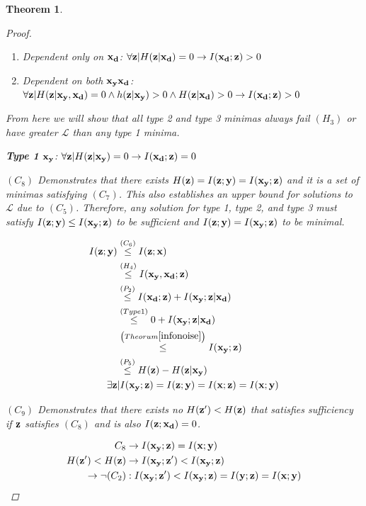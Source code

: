 \documentclass[letterpaper]{article} %
\theoremstyle{plain}
\newtheorem{theorem}{Theorem}[section]
\theoremstyle{definition}
\theoremstyle{remark}
\begin{document}
\begin{theorem}
\begin{proof}
\begin{enumerate}
    \item Dependent only on ${\mathbf{x}}_{\mathbf{d}}$: $\forall {\mathbf{z}}|H({\mathbf{z}}| {\mathbf{x}}_{\mathbf{d}})=0 \rightarrow I({\mathbf{x}}_{\mathbf{d}}; {\mathbf{z}}) > 0$
    
    \item Dependent on both ${\mathbf{x}}_{\mathbf{y}} {\mathbf{x}}_{\mathbf{d}}$: $\forall {\mathbf{z}}|H({\mathbf{z}}|{\mathbf{x}}_{\mathbf{y}}, {\mathbf{x}}_{\mathbf{d}})=0 \land h({\mathbf{z}}| {\mathbf{x}}_{\mathbf{y}})>0 \land H({\mathbf{z}}| {\mathbf{x}}_{\mathbf{d}})>0 \rightarrow I({\mathbf{x}}_{\mathbf{d}}; {\mathbf{z}}) > 0$
\end{enumerate}

From here we will show that all type 2 and type 3 minimas always fail $(H_3)$ or have greater $\mathcal{L}$ than any type 1 minima. 

\textbf{Type 1} ${\mathbf{x}}_{\mathbf{y}}$: $\forall {\mathbf{z}}|H({\mathbf{z}}| {\mathbf{x}}_{\mathbf{y}})=0 \rightarrow I({\mathbf{x}}_{\mathbf{d}}; {\mathbf{z}}) = 0$

$(C_8)$ Demonstrates that there exists $H({\mathbf{z}}) = I({\mathbf{z}}; {\mathbf{y}}) = I({\mathbf{x}}_{\mathbf{y}}; {\mathbf{z}})$ and it is a set of minimas satisfying $(C_7)$. This also establishes an upper bound for solutions to $\mathcal{L}$ due to $(C_5)$. Therefore, any solution for type 1, type 2, and type 3 must satisfy $I({\mathbf{z}}; {\mathbf{y}}) \leq I({\mathbf{x}}_{\mathbf{y}}; {\mathbf{z}})$ to be sufficient and $I({\mathbf{z}}; {\mathbf{y}}) = I({\mathbf{x}}_{\mathbf{y}}; {\mathbf{z}})$ to be minimal.

$$
\begin{aligned}
    I({\mathbf{z}}; {\mathbf{y}})&\stackrel{\left(C_6\right)}{\leq} I({\mathbf{z}}; {\mathbf{x}})  \\
    &\stackrel{\left(H_4\right)}{\leq}  I({\mathbf{x}}_{\mathbf{y}}, {\mathbf{x}}_{\mathbf{d}}; {\mathbf{z}}) \\
    &\stackrel{\left(P_2\right)}{\leq} I({\mathbf{x}}_{\mathbf{d}}; {\mathbf{z}}) + I({\mathbf{x}}_{\mathbf{y}}; {\mathbf{z}}| {\mathbf{x}}_{\mathbf{d}})\\
    &\stackrel{\left(Type1\right)}{\leq} 0 + I({\mathbf{x}}_{\mathbf{y}}; {\mathbf{z}}| {\mathbf{x}}_{\mathbf{d}})\\
    &\stackrel{\left(Theorum\ref{infonoise}\right)}{\leq} I({\mathbf{x}}_{\mathbf{y}}; {\mathbf{z}})\\
    &\stackrel{\left(P_5\right)}{\leq} H({\mathbf{z}}) - H({\mathbf{z}}| {\mathbf{x}}_{\mathbf{y}})\\
    \exists {\mathbf{z}} &|I({\mathbf{x}}_{\mathbf{y}}; {\mathbf{z}})  = I({\mathbf{z}}; {\mathbf{y}}) = I({\mathbf{x}}; {\mathbf{z}}) = I({\mathbf{x}}; {\mathbf{y}})
\end{aligned}
$$

$(C_{9})$ Demonstrates that there exists no $H({\mathbf{z}}') < H({\mathbf{z}})$ that satisfies sufficiency if ${\mathbf{z}}$ satisfies $(C_8)$ and is also $I({\mathbf{z}}; {\mathbf{x}}_{\mathbf{d}}) = 0$. 

$$
\begin{aligned}
    C_8 &\rightarrow  I({\mathbf{x}}_{\mathbf{y}}; {\mathbf{z}}) = I({\mathbf{x}}; {\mathbf{y}})\\
    H({\mathbf{z}}') < H({\mathbf{z}}) & \rightarrow I({\mathbf{x}}_{\mathbf{y}}; {\mathbf{z}}') < I({\mathbf{x}}_{\mathbf{y}}; {\mathbf{z}}) \\
    \rightarrow \neg (C_2) &: I({\mathbf{x}}_{\mathbf{y}}; {\mathbf{z}}') < I({\mathbf{x}}_{\mathbf{y}}; {\mathbf{z}}) = I({\mathbf{y}}; {\mathbf{z}}) = I({\mathbf{x}}; {\mathbf{y}})
\end{aligned}
$$


\end{proof}
\end{theorem}
\end{document}
